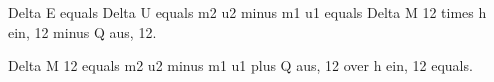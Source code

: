 Delta E equals Delta U equals m2 u2 minus m1 u1 equals Delta M 12 times h ein, 12 minus Q aus, 12.

Delta M 12 equals m2 u2 minus m1 u1 plus Q aus, 12 over h ein, 12 equals.